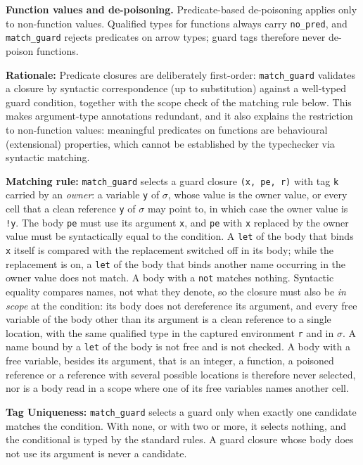 \documentclass[12pt]{article}
\begin{document}
\noindent\textbf{Function values and de-poisoning.} Predicate-based de-poisoning
applies only to non-function values. Qualified types for functions always carry
\texttt{no\_pred}, and \texttt{match\_guard} rejects predicates on arrow types;
guard tags therefore never de-poison functions.

\textbf{Rationale:} Predicate closures are deliberately first-order: \texttt{match\_guard}
validates a closure by syntactic correspondence (up to substitution) against a
well-typed guard condition, together with the scope check of the matching rule
below. This makes argument-type annotations redundant, and it
also explains the restriction to non-function values: meaningful predicates on
functions are behavioural (extensional) properties, which cannot be established by
the typechecker via syntactic matching.

\textbf{Matching rule:} \texttt{match\_guard} selects a guard closure
\texttt{(x, pe, r)} with tag \texttt{k} carried by an \emph{owner}: a variable
\texttt{y} of $\sigma$, whose value is the owner value, or every cell that a
clean reference \texttt{y} of $\sigma$ may point to, in which case the owner
value is \texttt{!y}. The body \texttt{pe} must use its argument \texttt{x},
and \texttt{pe} with \texttt{x} replaced by the owner value must be
syntactically equal to the condition. A \texttt{let} of the body that binds
\texttt{x} itself is compared with the replacement switched off in its body;
while the replacement is on, a \texttt{let} of the body that binds another name
occurring in the owner value does not match. A body with a \texttt{not} matches
nothing. Syntactic equality compares names, not what they denote, so the
closure must also be \emph{in scope} at the condition: its body does not
dereference its argument, and every free variable of the body other than its
argument is a clean reference to a single location, with the same qualified
type in the captured environment \texttt{r} and in $\sigma$. A name bound by a
\texttt{let} of the body is not free and is not checked. A body with a free
variable, besides its argument, that is an integer, a function, a poisoned
reference or a reference with several possible locations is therefore never
selected, nor is a body read in a scope where one of its free variables names
another cell.

\textbf{Tag Uniqueness:} \texttt{match\_guard} selects a guard only when
exactly one candidate matches the condition. With none, or with two or more,
it selects nothing, and the conditional is typed by the standard rules. A guard
closure whose body does not use its argument is never a candidate.
\end{document}
